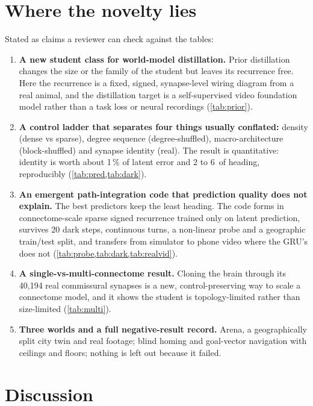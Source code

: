 \section{Where the novelty lies}
\label{sec:novelty}
Stated as claims a reviewer can check against the tables:
\begin{enumerate}
  \item \textbf{A new student class for world-model distillation.} Prior distillation changes the size or the family
        of the student but leaves its recurrence free. Here the recurrence is a fixed, signed, synapse-level wiring
        diagram from a real animal, and the distillation target is a self-supervised video foundation model rather
        than a task loss or neural recordings (\cref{tab:prior}).
  \item \textbf{A control ladder that separates four things usually conflated:} density (dense vs sparse), degree
        sequence (degree-shuffled), macro-architecture (block-shuffled) and synapse identity (real). The result is
        quantitative: identity is worth about 1\,\% of latent error and 2 to 6\degree\ of heading, reproducibly
        (\cref{tab:pred,tab:dark}).
  \item \textbf{An emergent path-integration code that prediction quality does not explain.} The best predictors keep
        the least heading. The code forms in connectome-scale sparse signed recurrence trained only on latent
        prediction, survives 20 dark steps, continuous turns, a non-linear probe and a geographic train/test split, and
        transfers from simulator to phone video where the GRU's does not (\cref{tab:probe,tab:dark,tab:realvid}).
  \item \textbf{A single-vs-multi-connectome result.} Cloning the brain through its 40,194 real commissural synapses
        is a new, control-preserving way to scale a connectome model, and it shows the student is topology-limited
        rather than size-limited (\cref{tab:multi}).
  \item \textbf{Three worlds and a full negative-result record.} Arena, a geographically split city twin and real
        footage; blind homing and goal-vector navigation with ceilings and floors; nothing is left out because it
        failed.
\end{enumerate}

\section{Discussion}
\label{sec:discussion}
